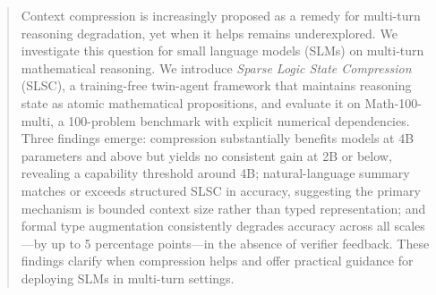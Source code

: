 \begin{abstract}
Context compression is increasingly proposed as a remedy for multi-turn reasoning degradation, yet when it helps remains underexplored. We investigate this question for small language models (SLMs) on multi-turn mathematical reasoning. We introduce \textit{Sparse Logic State Compression} (SLSC), a training-free twin-agent framework that maintains reasoning state as atomic mathematical propositions, and evaluate it on Math-100-multi, a 100-problem benchmark with explicit numerical dependencies. Three findings emerge: compression substantially benefits models at 4B parameters and above but yields no consistent gain at 2B or below, revealing a capability threshold around 4B; natural-language summary matches or exceeds structured SLSC in accuracy, suggesting the primary mechanism is bounded context size rather than typed representation; and formal type augmentation consistently degrades accuracy across all scales---by up to 5 percentage points---in the absence of verifier feedback. These findings clarify when compression helps and offer practical guidance for deploying SLMs in multi-turn settings.
\end{abstract}
